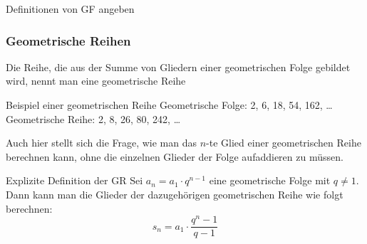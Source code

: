 \begin{bsp} {Definitionen von GF angeben}{}
\begin{itemize}
            


        
    \end{itemize}

\end{bsp}






\clearpage
\subsubsection{Geometrische Reihen}
Die Reihe, die aus der Summe von Gliedern einer geometrischen Folge gebildet wird, nennt man eine geometrische Reihe
\begin{bsp}
    {Beispiel einer geometrischen Reihe}{}
    Geometrische Folge: 2, 6, 18, 54, 162, \dots\newline
    Geometrische Reihe: 2, 8, 26, 80, 242, \dots
\end{bsp}

Auch hier stellt sich die Frage, wie man das $n$-te Glied einer geometrischen Reihe berechnen kann, ohne die einzelnen Glieder der Folge aufaddieren zu müssen.

\begin{satz}
    {Explizite Definition der GR}{}
    Sei $a_n=a_1\cdot q^{n-1}$ eine geometrische Folge mit $q\neq 1$.
Dann kann man die Glieder der dazugehörigen geometrischen Reihe wie folgt berechnen:  
$$ s_n=a_1\cdot \frac{q^n-1}{q-1}  $$
\end{satz}


